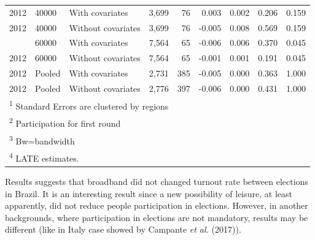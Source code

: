 \documentclass[12pt,]{article}
\begin{document}
\begin{table}[!h]
\begin{tabular}{lllrrrrrr}
2012 & 40000 & With covariates & 3,699 & 76 & 0.003 & 0.002 & 0.206 & 0.159\\
2012 & 40000 & Without covariates & 3,699 & 76 & -0.005 & 0.008 & 0.569 & 0.159\\
\addlinespace
2012 & 60000 & With covariates & 7,564 & 65 & -0.006 & 0.006 & 0.370 & 0.045\\
2012 & 60000 & Without covariates & 7,564 & 65 & -0.001 & 0.001 & 0.191 & 0.045\\
2012 & Pooled & With covariates & 2,731 & 385 & -0.005 & 0.000 & 0.363 & 1.000\\
2012 & Pooled & Without covariates & 2,776 & 397 & -0.006 & 0.000 & 0.431 & 1.000\\
\bottomrule
\multicolumn{9}{l}{\textsuperscript{1} Standard Errors are clustered by regions}\\
\multicolumn{9}{l}{\textsuperscript{2} Participation for first round}\\
\multicolumn{9}{l}{\textsuperscript{3} Bw=bandwidth}\\
\multicolumn{9}{l}{\textsuperscript{4} LATE estimates.}\\
\end{tabular}
\end{table}

Results suggests that broadband did not changed turnout rate between
elections in Brazil. It is an interesting result since a new possibility
of leisure, at least apparently, did not reduce people participation in
elections. However, in another backgrounds, where participation in
elections are not mandatory, results may be different (like in Italy
case showed by Campante \emph{et al.} (2017)).
\end{document}
